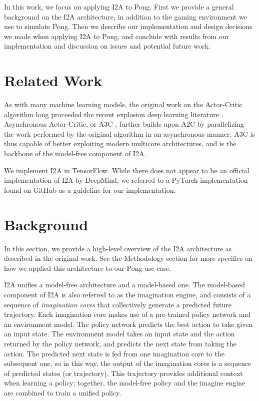 \documentclass[10pt, twocolumn]{article}
\begin{document}
In this work, we focus on applying I2A to Pong. First we provide a general background on the I2A architecture, in addition
to the gaming environment we use to simulate Pong. Then we describe our implementation and design decisions we made when applying I2A to Pong, and conclude with results from our implementation and discussion on issues and potential future work.

\section{Related Work}
As with many machine learning models, the original work on the Actor-Critic algorithm long proceeded the recent explosion deep learning literature \cite{A2C}. Asynchronous Actor-Critic, or A3C \cite{A3C}, further builds upon A2C by parallelizing the work performed by the original algorithm in an asynchronous manner. A3C is thus capable of better exploiting modern multicore architectures, and is the backbone of the model-free component of I2A.

We implement I2A in TensorFlow. While there does not appear to be an official implementation of I2A by DeepMind, we referred to a PyTorch implementation found on GitHub \cite{github} as a guideline for our implementation.

\section{Background}

In this section, we provide a high-level overview of the I2A architecture as described in the original work. See the Methodology section for more specifics on how we applied this architecture to our Pong use case.

I2A unifies a model-free 
architecture and a model-based one. The model-based component of I2A is also referred to as the imagination engine, and consists of a 
sequence of \emph{imagination cores} that collectively generate a predicted future trajectory. Each imagination core makes use of a pre-trained policy network and an environment model. The policy network predicts the best action to take given an input state. The environment model takes an input state and the action returned by the policy network, and predicts the next state from taking the action. The predicted next state is fed from one imagination core to the subsequent one, so in this way, the output of the imagination cores is a sequence of predicted states (or trajectory). This trajectory provides additional context when learning a policy; together, the model-free policy and the imagine engine are combined to train a unified policy.
\end{document}
